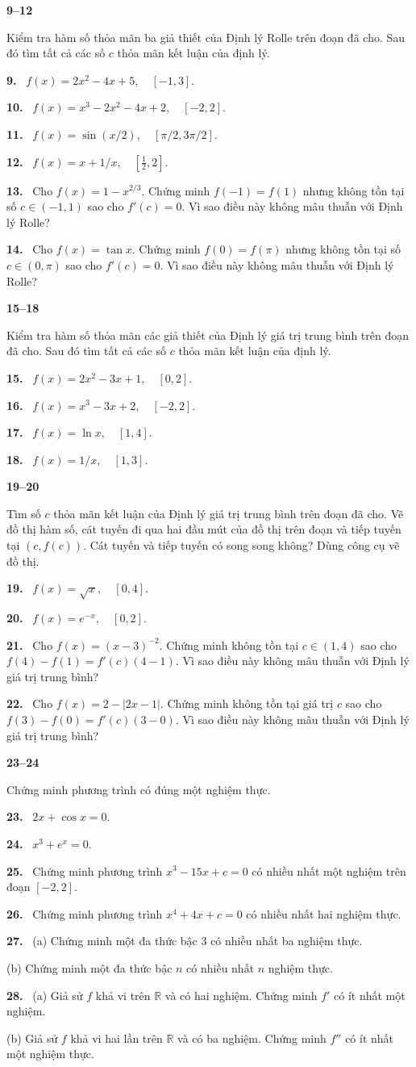 \documentclass[12pt,a4paper]{article}
\newcommand{\bt}[1]{\par\smallskip\Needspace{5\baselineskip}\noindent\textbf{#1.}\ }
\newcommand{\group}[1]{\par\medskip\noindent\textbf{#1}\par\nopagebreak[4]}
\begin{document}
\group{9–12} Kiểm tra hàm số thỏa mãn ba giả thiết của Định lý Rolle trên đoạn đã cho. Sau đó tìm tất cả các số $c$ thỏa mãn kết luận của định lý.
\bt{9} $f(x)=2x^2-4x+5,\quad [-1,3]$.
\bt{10} $f(x)=x^3-2x^2-4x+2,\quad [-2,2]$.
\bt{11} $f(x)=\sin(x/2),\quad [\pi/2,3\pi/2]$.
\bt{12} $f(x)=x+1/x,\quad [\frac12,2]$.
\bt{13} Cho $f(x)=1-x^{2/3}$. Chứng minh $f(-1)=f(1)$ nhưng không tồn tại số $c\in(-1,1)$ sao cho $f'(c)=0$. Vì sao điều này không mâu thuẫn với Định lý Rolle?
\bt{14} Cho $f(x)=\tan x$. Chứng minh $f(0)=f(\pi)$ nhưng không tồn tại số $c\in(0,\pi)$ sao cho $f'(c)=0$. Vì sao điều này không mâu thuẫn với Định lý Rolle?
\group{15–18} Kiểm tra hàm số thỏa mãn các giả thiết của Định lý giá trị trung bình trên đoạn đã cho. Sau đó tìm tất cả các số $c$ thỏa mãn kết luận của định lý.
\bt{15} $f(x)=2x^2-3x+1,\quad [0,2]$.
\bt{16} $f(x)=x^3-3x+2,\quad [-2,2]$.
\bt{17} $f(x)=\ln x,\quad [1,4]$.
\bt{18} $f(x)=1/x,\quad [1,3]$.
\group{19–20} Tìm số $c$ thỏa mãn kết luận của Định lý giá trị trung bình trên đoạn đã cho. Vẽ đồ thị hàm số, cát tuyến đi qua hai đầu mút của đồ thị trên đoạn và tiếp tuyến tại $(c,f(c))$. Cát tuyến và tiếp tuyến có song song không? Dùng công cụ vẽ đồ thị.
\bt{19} $f(x)=\sqrt{x},\quad [0,4]$.
\bt{20} $f(x)=e^{-x},\quad [0,2]$.
\bt{21} Cho $f(x)=(x-3)^{-2}$. Chứng minh không tồn tại $c\in(1,4)$ sao cho $f(4)-f(1)=f'(c)(4-1)$. Vì sao điều này không mâu thuẫn với Định lý giá trị trung bình?
\bt{22} Cho $f(x)=2-|2x-1|$. Chứng minh không tồn tại giá trị $c$ sao cho $f(3)-f(0)=f'(c)(3-0)$. Vì sao điều này không mâu thuẫn với Định lý giá trị trung bình?
\group{23–24} Chứng minh phương trình có đúng một nghiệm thực.
\bt{23} $2x+\cos x=0$.
\bt{24} $x^3+e^x=0$.
\bt{25} Chứng minh phương trình $x^3-15x+c=0$ có nhiều nhất một nghiệm trên đoạn $[-2,2]$.
\bt{26} Chứng minh phương trình $x^4+4x+c=0$ có nhiều nhất hai nghiệm thực.
\bt{27} (a) Chứng minh một đa thức bậc 3 có nhiều nhất ba nghiệm thực.

(b) Chứng minh một đa thức bậc $n$ có nhiều nhất $n$ nghiệm thực.
\bt{28} (a) Giả sử $f$ khả vi trên $\mathbb R$ và có hai nghiệm. Chứng minh $f'$ có ít nhất một nghiệm.

(b) Giả sử $f$ khả vi hai lần trên $\mathbb R$ và có ba nghiệm. Chứng minh $f''$ có ít nhất một nghiệm thực.
\end{document}
